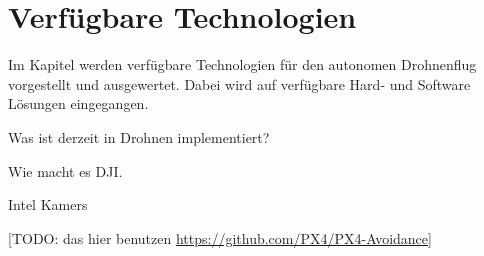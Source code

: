 
\chapter{Verfügbare Technologien}
\label{chap:sota}

Im Kapitel werden verfügbare Technologien für den autonomen Drohnenflug vorgestellt und ausgewertet. Dabei wird auf verfügbare Hard- und Software Lösungen eingegangen.

Was ist derzeit in Drohnen implementiert?

Wie macht es DJI.

Intel Kamers

[TODO: das hier benutzen \url{https://github.com/PX4/PX4-Avoidance}]

%
%
%
